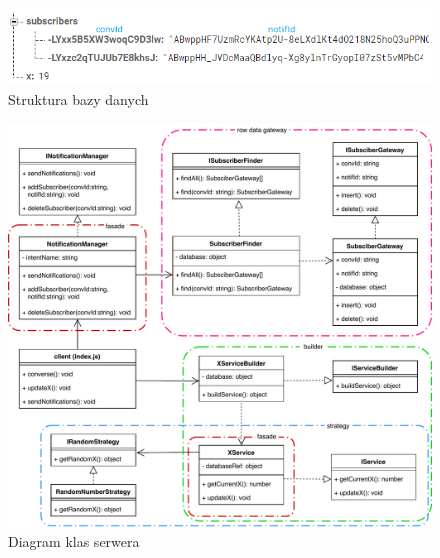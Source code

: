 \documentclass[a4paper,11pt]{article}
\begin{document}
         \begin{figure}[!h]
	    	\begin{center}
	    		\includegraphics[width=16cm]{db.PNG}
	    	\end{center}
	    	\caption[Caption for LOF]{Struktura bazy danych}
	    	\label{db}
	    \end{figure}
    

        \begin{figure}[!h]
    		\begin{center}
    			\includegraphics[width=16cm]{guess-x-classes.pdf}
    		\end{center}
    		\caption[Caption for LOF]{Diagram klas serwera}
    		\label{classes}
    	\end{figure}
    
\end{document}
